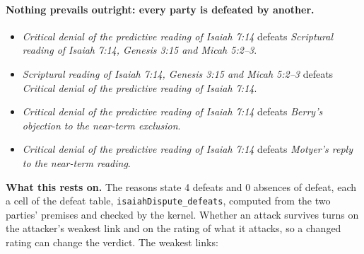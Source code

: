 \documentclass[11pt]{article}
\begin{document}
\paragraph{Nothing prevails outright: every party is defeated by another.}
\begin{itemize}
\item \emph{Critical denial of the predictive reading of Isaiah 7:14} defeats \emph{Scriptural reading of Isaiah 7:14, Genesis 3:15 and Micah 5:2–3}.
\item \emph{Scriptural reading of Isaiah 7:14, Genesis 3:15 and Micah 5:2–3} defeats \emph{Critical denial of the predictive reading of Isaiah 7:14}.
\item \emph{Critical denial of the predictive reading of Isaiah 7:14} defeats \emph{Berry’s objection to the near-term exclusion}.
\item \emph{Critical denial of the predictive reading of Isaiah 7:14} defeats \emph{Motyer’s reply to the near-term reading}.
\end{itemize}
\par\noindent\textbf{What this rests on.} The reasons state 4 defeats and 0 absences of defeat, each a cell of the defeat table, \texttt{isaiah\allowbreak{}Dispute\_\allowbreak{}defeats}, computed from the two parties' premises and checked by the kernel. Whether an attack survives turns on the attacker's weakest link and on the rating of what it attacks, so a changed rating can change the verdict. The weakest links:
\end{document}
